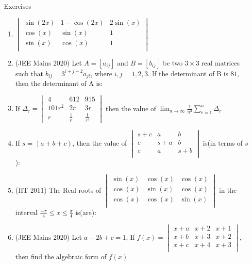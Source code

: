 \begin{xcb}{Exercises}
\begin{enumerate}
    \item $\begin{vmatrix}
    \sin(2x) & 1-\cos(2x) & 2\sin(x) \\
    \cos(x) & \sin(x) & 1 \\
    \sin(x) & \cos(x) & 1 \\
\end{vmatrix}$\\
\item (JEE Mains 2020)  Let $A = [a_{ij}]$ and $B = [b_{ij}]$ be two $3 \times 3$ real matrices such that $b_{ij} = 3^{i + j -2}a_{ji}$, where $i, j = 1, 2, 3$. If the determinant of B is $81$, then the determinant of A is: \\
\item If $\Delta_r=\begin{vmatrix}
    4 & 612 & 915\\
    101r^2 & 2r & 3r\\
    r & \frac{1}{r}& \frac{1}{r^2}
\end{vmatrix}$ then the value of $\lim_{n \to \infty} \frac{1}{n^3} \sum^{n}_{r=1}\Delta_r$\\
\item If $s=(a+b+c)$, then the value of $\begin{vmatrix}
    s+c & a & b \\
    c & s+a & b \\
    c & a & s+b \\
\end{vmatrix}$ is(in terms of $s$):\\
\item (IIT 2011) The Real roots of $\begin{vmatrix}
    \sin(x) & \cos(x) & \cos(x) \\
    \cos(x) & \sin(x) & \cos(x) \\
    \cos(x) & \cos(x) & \sin(x) \\
\end{vmatrix}$ in the interval $\frac{-\pi}{4}\leq x \leq \frac{\pi}{4}$ is(are):
\item (JEE Mains 2020) Let $a-2b+c=1$, If $f(x)=\begin{vmatrix}
    x+a & x+2 & x+1 \\
    x+b & x+3 & x+2 \\
    x+c & x+4 & x+3 \\
\end{vmatrix},$ then find the algebraic form of $f(x)$ \\

\end{enumerate}
\end{xcb}
